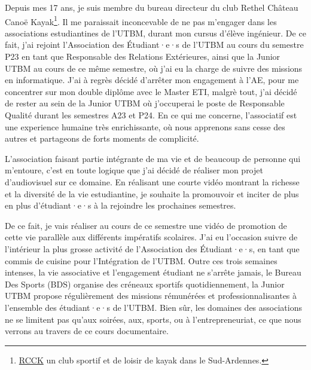 
Depuis mes 17 ans, je suis membre du bureau directeur du club Rethel Château Canoë Kayak\footnote{\href{https://rcck-ardennes.fr}{RCCK} un club sportif et de loisir de kayak dans le Sud-Ardennes.}.
Il me paraissait inconcevable de ne pas m'engager dans les associations estudiantines de l'UTBM, durant mon cursus d'élève ingénieur.
De ce fait, j'ai rejoint l'Association des Étudiant·e·s de l'UTBM au cours du semestre P23 en tant que Responsable des Relations Extérieures, ainsi que la Junior UTBM au cours de ce même semestre, où j'ai eu la charge de suivre des missions en informatique.
J'ai à regrès décidé d'arrêter mon engagement à l'AE, pour me concentrer sur mon double diplôme avec le Master ETI, malgrè tout, j'ai décidé de rester au sein de la Junior UTBM où j'occuperai le poste de Responsable Qualité durant les semestres A23 et P24.
En ce qui me concerne, l'associatif est une experience humaine très enrichissante, où nous apprenons sans cesse des autres et partageons de forts moments de complicité.

L'association faisant partie intégrante de ma vie et de beaucoup de personne qui m'entoure, c'est en toute logique que j'ai décidé de réaliser mon projet d'audiovisuel sur ce domaine.
En réalisant une courte vidéo montrant la richesse et la diversité de la vie estudiantine, je souhaite la promouvoir et inciter de plus en plus d'étudiant·e·s à la rejoindre les prochaines semestres.

De ce fait, je vais réaliser au cours de ce semestre une vidéo de promotion de cette vie parallèle aux différents impératifs scolaires.
J'ai eu l'occasion suivre de l'intérieur la plus grosse activité de l'Association des Étudiant·e·s, en tant que commis de cuisine pour l'Intégration de l'UTBM.
Outre ces trois semaines intenses, la vie associative et l'engagement étudiant ne s'arrête jamais, le Bureau Des Sports (BDS) organise des créneaux sportifs quotidiennement, la Junior UTBM propose régulièrement des missions rémunérées et professionnalisantes à l'ensemble des étudiant·e·s de l'UTBM.
Bien sûr, les domaines des associations ne se limitent pas qu'aux soirées, aux, sports, ou à l'entrepreneuriat, ce que nous verrons au travers de ce cours documentaire.